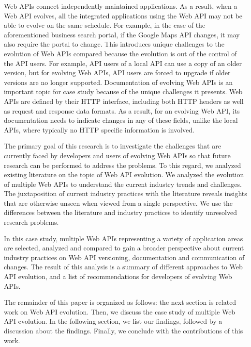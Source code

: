 \documentclass[conference]{IEEEtran}
\begin{document}
Web APIs connect independently maintained applications. As a result, when a Web API evolves, all the integrated applications using the Web API may not be able to evolve on the same schedule. For example, in the case of the aforementioned business search portal, if the Google Maps API changes, it may also require the portal to change. This introduces unique challenges to the evolution of Web APIs compared because the evolution is out of the control of the API users. For example, API users of a local API can use a copy of an older version, but for evolving Web APIs, API users are forced to upgrade if older versions are no longer supported. Documentation of evolving Web APIs is an important topic for case study because of the unique challenges it presents. Web APIs are defined by their HTTP interface, including both HTTP headers as well as request and response data formats. As a result, for an evolving Web API, its documentation needs to indicate changes in any of these fields, unlike the local APIs, where typically no HTTP specific information is involved.

The primary goal of this research is to investigate the challenges that are currently faced by developers and users of evolving Web APIs so that future research can be performed to address the problems. To this regard, we analyzed existing literature on the topic of Web API evolution. We analyzed the evolution of multiple Web APIs to understand the current industry trends and challenges. The juxtaposition of current industry practices with the literature reveals insights that are otherwise unseen when viewed from a single perspective. We use the differences between the literature and industry practices to identify unresolved research problems.

In this case study, multiple Web APIs representing a variety of application areas are selected, analyzed and compared to gain a broader perspective about current industry practices on Web API versioning, documentation and communication of changes. The result of this analysis is a summary of different approaches to Web API evolution, and a list of recommendations for developers of evolving Web APIs.

The remainder of this paper is organized as follows: the next section is related work on Web API evolution. Then, we discuss the case study of multiple Web API evolution. In the following section, we list our findings, followed by a discussion about the findings. Finally, we conclude with the contributions of this work.
\end{document}
